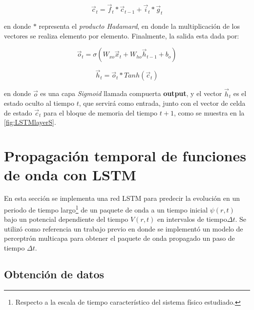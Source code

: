 \begin{equation}\label{eq:ct}
\vec{c}_t = \vec{f}_t \ast \vec{c}_{t-1} + \vec{i}_t \ast \vec{g}_t
\end{equation}

en donde $\ast$ representa el \emph{producto Hadamard}, en donde la multiplicación de los vectores se realiza elemento por elemento. Finalmente, la salida esta dada por:

\begin{equation}\label{eq:ot}
\vec{o}_t = \sigma(W_{xo}\vec{x}_t + W_{ho}\vec{h}_{t-1} + b_o)
\end{equation}

\begin{equation}\label{eq:ht}
\vec{h}_t = \vec{o}_t\ast Tanh(\vec{c}_t)
\end{equation}

en donde $\vec{o}$ es una capa \emph{Sigmoid} llamada compuerta \textbf{output}, y el vector $\vec{h}_t$ es el estado oculto al tiempo $t$, que servirá como entrada, junto con el vector de celda de estado $\vec{c}_t$ para el bloque de memoria del tiempo $t+1$, como se muestra en la \autoref{fig:LSTMlayerS}.


\section{Propagación temporal de funciones de onda con LSTM}\label{sec:Project}

En esta sección se implementa una red \acs{LSTM} para predecir la evolución en un periodo de tiempo largo\footnote{Respecto a la escala de tiempo característico del sistema físico estudiado.} de un paquete de onda a un tiempo inicial $\psi(r,t)$ bajo un potencial dependiente del tiempo $V(r,t)$ en intervalos de tiempo$\Delta t$. Se utilizó como referencia un trabajo previo \cite{Main:2021} en donde se implementó un modelo de perceptrón multicapa para obtener el paquete de onda propagado un paso de tiempo $\Delta t$.

\subsection{Obtención de datos}\label{sec:6.4.1}

